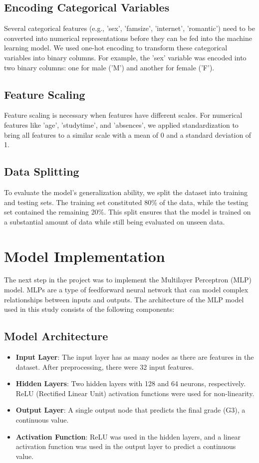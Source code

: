 \documentclass[a4paper,12pt]{article}
\begin{document}
\subsection{Encoding Categorical Variables}
Several categorical features (e.g., 'sex', 'famsize', 'internet', 'romantic') need to be converted into numerical representations before they can be fed into the machine learning model. We used one-hot encoding to transform these categorical variables into binary columns. For example, the 'sex' variable was encoded into two binary columns: one for male ('M') and another for female ('F').

\subsection{Feature Scaling}
Feature scaling is necessary when features have different scales. For numerical features like 'age', 'studytime', and 'absences', we applied standardization to bring all features to a similar scale with a mean of 0 and a standard deviation of 1.

\subsection{Data Splitting}
To evaluate the model's generalization ability, we split the dataset into training and testing sets. The training set constituted 80\% of the data, while the testing set contained the remaining 20\%. This split ensures that the model is trained on a substantial amount of data while still being evaluated on unseen data.

\section{Model Implementation}
The next step in the project was to implement the Multilayer Perceptron (MLP) model. MLPs are a type of feedforward neural network that can model complex relationships between inputs and outputs. The architecture of the MLP model used in this study consists of the following components:

\subsection{Model Architecture}
\begin{itemize}
    \item \textbf{Input Layer}: The input layer has as many nodes as there are features in the dataset. After preprocessing, there were 32 input features.
    \item \textbf{Hidden Layers}: Two hidden layers with 128 and 64 neurons, respectively. ReLU (Rectified Linear Unit) activation functions were used for non-linearity.
    \item \textbf{Output Layer}: A single output node that predicts the final grade (G3), a continuous value.
    \item \textbf{Activation Function}: ReLU was used in the hidden layers, and a linear activation function was used in the output layer to predict a continuous value.
\end{itemize}
\end{document}
